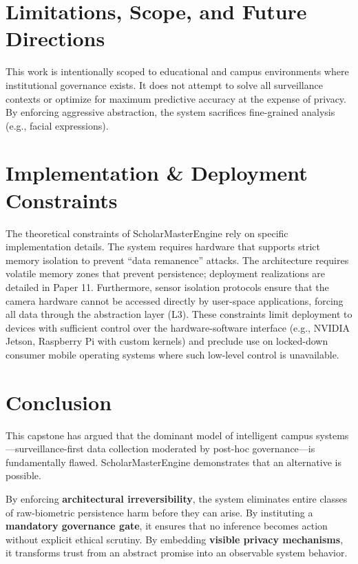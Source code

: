 \documentclass[conference]{IEEEtran}
\begin{document}
\section{Limitations, Scope, and Future Directions}
This work is intentionally scoped to educational and campus environments where institutional governance exists. It does not attempt to solve all surveillance contexts or optimize for maximum predictive accuracy at the expense of privacy. By enforcing aggressive abstraction, the system sacrifices fine-grained analysis (e.g., facial expressions).

\section{Implementation \& Deployment Constraints}
The theoretical constraints of ScholarMasterEngine rely on specific implementation details. The system requires hardware that supports strict memory isolation to prevent ``data remanence'' attacks. The architecture requires volatile memory zones that prevent persistence; deployment realizations are detailed in Paper 11. Furthermore, sensor isolation protocols ensure that the camera hardware cannot be accessed directly by user-space applications, forcing all data through the abstraction layer (L3). These constraints limit deployment to devices with sufficient control over the hardware-software interface (e.g., NVIDIA Jetson, Raspberry Pi with custom kernels) and preclude use on locked-down consumer mobile operating systems where such low-level control is unavailable.

\section{Conclusion}
This capstone has argued that the dominant model of intelligent campus systems---surveillance-first data collection moderated by post-hoc governance---is fundamentally flawed. ScholarMasterEngine demonstrates that an alternative is possible.

By enforcing \textbf{architectural irreversibility}, the system eliminates entire classes of raw-biometric persistence harm before they can arise. By instituting a \textbf{mandatory governance gate}, it ensures that no inference becomes action without explicit ethical scrutiny. By embedding \textbf{visible privacy mechanisms}, it transforms trust from an abstract promise into an observable system behavior.
\end{document}
